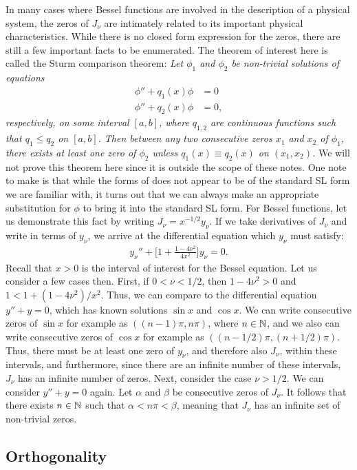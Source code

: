In many cases where Bessel functions are involved in the description of a physical system, the zeros of $J_{\nu}$ are intimately related to its important physical characteristics.
While there is no closed form expression for the zeros, there are still a few important facts to be enumerated.
The theorem of interest here is called the Sturm comparison theorem: 
\textit{Let $\phi_1$ and $\phi_2$ be non-trivial solutions of equations
\begin{align}
    \label{eq:SL1-zeros}
    \phi'' + q_1(x) \phi &= 0 \\
    \label{eq:SL2-zeros}
    \phi'' + q_2(x) \phi &= 0
,\end{align}
respectively, on some interval $[a,b]$, where $q_{1,2}$ are continuous functions such that $q_1 \leq q_2$ on $[a,b]$.
Then between any two consecutive zeros $x_1$ and $x_2$ of $\phi_1$, there exists at least one zero of $\phi_2$ unless $q_1(x) \equiv q_2(x)$ on $(x_1,x_2)$.
}
We will not prove this theorem here since it is outside the scope of these notes.
One note to make is that while the forms of  does not appear to be of the standard SL form we are familiar with, it turns out that we can always make an appropriate substitution for $\phi$ to bring it into the standard SL form.
For Bessel functions, let us demonstrate this fact by writing $J_{\nu} = x^{-1/2} y_{\nu}$.
If we take derivatives of $J_{\nu}$ and write in terms of $y_{\nu}$, we arrive at the differential equation which $y_{\nu}$ must satisfy:
\begin{eqnarray}
    y_{\nu}'' + \Bigg[ 1 + \frac{1 - 4 \nu^2}{4 x^2} \Bigg] y_{\nu} = 0
.\end{eqnarray}
Recall that $x > 0$ is the interval of interest for the Bessel equation.
Let us consider a few cases then.
First, if $0 < \nu < 1/2$, then $1 - 4 \nu^2 > 0$ and $1 < 1 + (1 - 4\nu^2)/x^2$.
Thus, we can compare to the differential equation $y'' + y = 0$, which has known solutions $\sin{x}$ and $\cos{x}$.
We can write consecutive zeros of $\sin{x}$ for example as $((n-1)\pi,n\pi)$, where $n \in \mathbb{N}$, and we also can write consecutive zeros of $\cos{x}$ for example as $((n-1/2)\pi,(n+1/2)\pi)$.
Thus, there must be at least one zero of $y_{\nu}$, and therefore also $J_{\nu}$, within these intervals, and furthermore, since there are an infinite number of these intervals, $J_{\nu}$ has an infinite number of zeros.
Next, consider the case $\nu > 1/2$.
We can consider $y'' + y = 0$ again.
Let $\alpha$ and $\beta$ be consecutive zeros of $J_{\nu}$.
It follows that there exists $n \in \mathbb{N}$ such that $\alpha < n\pi < \beta$, meaning that $J_{\nu}$ has an infinite set of non-trivial zeros.



\subsection{Orthogonality}






